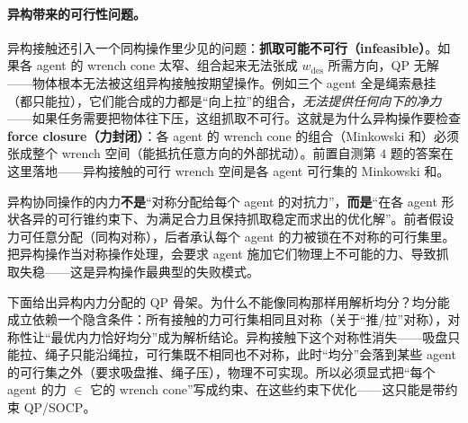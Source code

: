 \paragraph{异构带来的可行性问题。}
异构接触还引入一个同构操作里少见的问题：\textbf{抓取可能不可行（infeasible）}。如果各 agent 的 wrench cone 太窄、组合起来无法张成 $w_{\mathrm{des}}$ 所需方向，QP 无解——物体根本无法被这组异构接触按期望操作。例如三个 agent 全是绳索悬挂（都只能拉），它们能合成的力都是“向上拉”的组合，\emph{无法提供任何向下的净力}——如果任务需要把物体往下压，这组抓取不可行。这就是为什么异构操作要检查 \textbf{force closure（力封闭）}：各 agent 的 wrench cone 的组合（Minkowski 和）必须张成整个 wrench 空间（能抵抗任意方向的外部扰动）。前置自测第 $4$ 题的答案在这里落地——异构接触的可行 wrench 空间是各 agent 可行集的 Minkowski 和。

\begin{insight}
异构协同操作的内力\textbf{不是}“对称分配给每个 agent 的对抗力”，\textbf{而是}“在各 agent 形状各异的可行锥约束下、为满足合力且保持抓取稳定而求出的优化解”。前者假设力可任意分配（同构对称），后者承认每个 agent 的力被锁在不对称的可行集里。把异构操作当对称操作处理，会要求 agent 施加它们物理上不可能的力、导致抓取失稳——这是异构操作最典型的失败模式。
\end{insight}

\noindent 下面给出异构内力分配的 QP 骨架。为什么不能像同构那样用解析均分？均分能成立依赖一个隐含条件：所有接触的力可行集相同且对称（关于“推/拉”对称），对称性让“最优内力恰好均分”成为解析结论。异构接触下这个对称性消失——吸盘只能拉、绳子只能沿绳拉，可行集既不相同也不对称，此时“均分”会落到某些 agent 的可行集之外（要求吸盘推、绳子压），物理不可实现。所以必须显式把“每个 agent 的力 $\in$ 它的 wrench cone”写成约束、在这些约束下优化——这只能是带约束 QP/SOCP。

